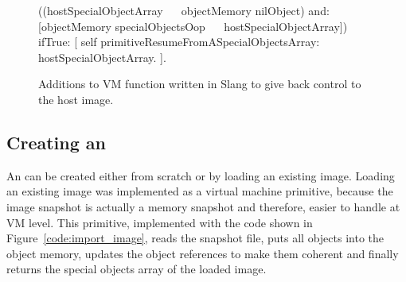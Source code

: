\begin{figure}[htb]
\begin{code}
((hostSpecialObjectArray ~~ objectMemory nilObject)
    and:
[objectMemory specialObjectsOop ~~ hostSpecialObjectArray])
        ifTrue: [ 
            self primitiveResumeFromASpecialObjectsArray:
                       hostSpecialObjectArray.
        ].
\end{code}
\caption{Additions to VM function \textbf{} written in Slang to give back control to the host image.
\label{code:heartbeat_contextswitch}}
\end{figure}

\subsection{Creating an \objectspace} \label{sec:object_space_creation}

An \objectspace can be created either from scratch or by loading an existing image. Loading an existing image was implemented as a virtual machine primitive, because the image snapshot is actually a memory snapshot and therefore, easier to handle at VM level. This primitive, implemented with the code shown in Figure~\ref{code:import_image}, reads the snapshot file, puts all objects into the object memory, updates the object references to make them coherent and finally returns the special objects array of the loaded image.


